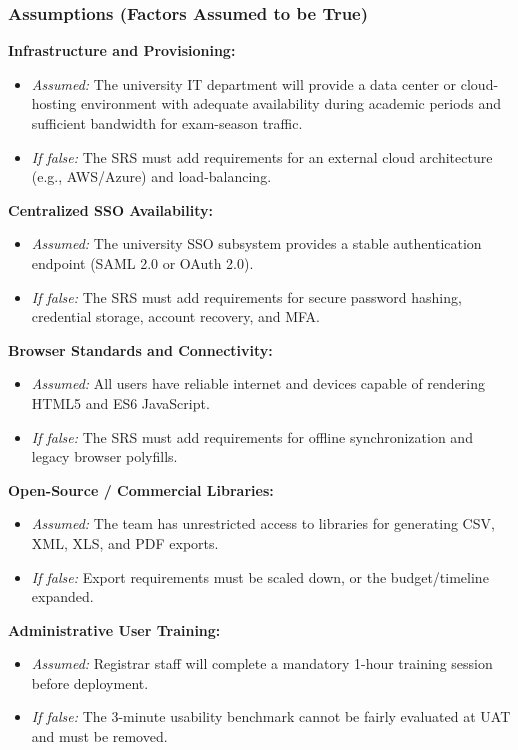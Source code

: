 \documentclass[11pt, a4paper]{article}
\begin{document}
\subsubsection{Assumptions (Factors Assumed to be True)}

\textbf{Infrastructure and Provisioning:}
\begin{itemize}
    \item \textit{Assumed:} The university IT department will provide a data center or cloud-hosting environment with adequate availability during academic periods and sufficient bandwidth for exam-season traffic.
    \item \textit{If false:} The SRS must add requirements for an external cloud architecture (e.g., AWS/Azure) and load-balancing.
\end{itemize}

\textbf{Centralized SSO Availability:}
\begin{itemize}
    \item \textit{Assumed:} The university SSO subsystem provides a stable authentication endpoint (SAML 2.0 or OAuth 2.0).
    \item \textit{If false:} The SRS must add requirements for secure password hashing, credential storage, account recovery, and MFA.
\end{itemize}

\textbf{Browser Standards and Connectivity:}
\begin{itemize}
    \item \textit{Assumed:} All users have reliable internet and devices capable of rendering HTML5 and ES6 JavaScript.
    \item \textit{If false:} The SRS must add requirements for offline synchronization and legacy browser polyfills.
\end{itemize}

\textbf{Open-Source / Commercial Libraries:}
\begin{itemize}
    \item \textit{Assumed:} The team has unrestricted access to libraries for generating CSV, XML, XLS, and PDF exports.
    \item \textit{If false:} Export requirements must be scaled down, or the budget/timeline expanded.
\end{itemize}

\textbf{Administrative User Training:}
\begin{itemize}
    \item \textit{Assumed:} Registrar staff will complete a mandatory 1-hour training session before deployment.
    \item \textit{If false:} The 3-minute usability benchmark cannot be fairly evaluated at UAT and must be removed.
\end{itemize}
\end{document}
